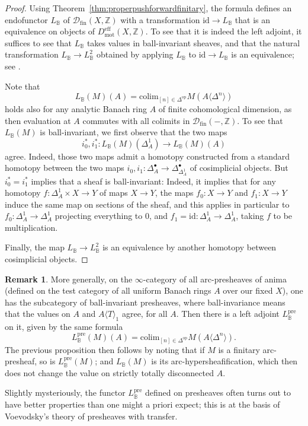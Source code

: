 \documentclass[11pt]{amsart}
\numberwithin{equation}{section}
\numberwithin{theorem}{section}
\theoremstyle{definition}
\newtheorem{remark}[theorem]{Remark}
\begin{document}
\begin{proof} Using Theorem~\ref{thm:properpushforwardfinitary}, the formula defines an endofunctor $L_{\mathbb B}$ of $\mathcal D_{\mathrm{fin}}(X,\mathbb Z)$ with a transformation $\mathrm{id}\to L_{\mathbb B}$ that is an equivalence on objects of $D_{\mathrm{mot}}^{\mathrm{eff}}(X,\mathbb Z)$. To see that it is indeed the left adjoint, it suffices to see that $L_{\mathbb B}$ takes values in ball-invariant sheaves, and that the natural transformation $L_{\mathbb B}\to L_{\mathbb B}^2$ obtained by applying $L_{\mathbb B}$ to $\mathrm{id}\to L_{\mathbb B}$ is an equivalence; see \cite[Proposition 5.2.7.4]{LurieHTT}.

Note that
\[
L_{\mathbb B}(M)(A) = \mathrm{colim}_{[n]\in \Delta^{\mathrm{op}}} M(A\langle\Delta^n\rangle)
\]
holds also for any analytic Banach ring $A$ of finite cohomological dimension, as then evaluation at $A$ commutes with all colimits in $\mathcal D_{\mathrm{fin}}(-,\mathbb Z)$. To see that $L_{\mathbb B}(M)$ is ball-invariant, we first observe that the two maps
\[
i_0^\ast,i_1^\ast: L_{\mathbb B}(M)(\Delta^1_A)\to L_{\mathbb B}(M)(A)
\]
agree. Indeed, those two maps admit a homotopy constructed from a standard homotopy between the two maps $i_0,i_1: \Delta^\bullet_A\to \Delta^\bullet_{\Delta^1_A}$ of cosimplicial objects. But $i_0^\ast=i_1^\ast$ implies that a sheaf is ball-invariant: Indeed, it implies that for any homotopy $f: \Delta^1_A\times X\to Y$ of maps $X\to Y$, the maps $f_0: X\to Y$ and $f_1: X\to Y$ induce the same map on sections of the sheaf, and this applies in particular to $f_0: \Delta^1_A\to \Delta^1_A$ projecting everything to $0$, and $f_1=\mathrm{id}: \Delta^1_A\to \Delta^1_A$, taking $f$ to be multiplication.

Finally, the map $L_{\mathbb B}\to L_{\mathbb B}^2$ is an equivalence by another homotopy between cosimplicial objects.
\end{proof}

\begin{remark}\label{rem:ballinvariantpresheaves} More generally, on the $\infty$-category of all arc-presheaves of anima (defined on the test category of all uniform Banach rings $A$ over our fixed $X$), one has the subcategory of ball-invariant presheaves, where ball-invariance means that the values on $A$ and $A\langle T\rangle_1$ agree, for all $A$. Then there is a left adjoint $L_{\mathbb B}^{\mathrm{pre}}$ on it, given by the same formula
\[
L_{\mathbb B}^{\mathrm{pre}}(M)(A) = \mathrm{colim}_{[n]\in \Delta^{\mathrm{op}}} M(A\langle\Delta^n\rangle).
\]
The previous proposition then follows by noting that if $M$ is a finitary arc-presheaf, so is $L_{\mathbb B}^{\mathrm{pre}}(M)$; and $L_{\mathbb B}(M)$ is its arc-hypersheafification, which then does not change the value on strictly totally disconnected $A$.

Slightly mysteriously, the functor $L_{\mathbb B}^{\mathrm{pre}}$ defined on presheaves often turns out to have better properties than one might a priori expect; this is at the basis of Voevodsky's theory of presheaves with transfer.
\end{remark}
\end{document}

